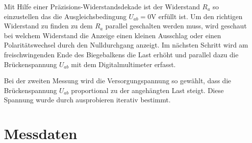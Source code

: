 Mit Hilfe einer Präzisions-Widerstandsdekade ist der Widerstand \( R_a \)
so einzustellen das die Ausgleichsbedingung \( U_{ab} = 0 \si{\volt} \) erfüllt ist.
Um den richtigen Widerstand zu finden zu dem \( R_a \) parallel geschalten werden muss,
wird geschaut bei welchem Widerstand die Anzeige einen kleinen Ausschlag
oder einen Polaritätswechsel durch den Nulldurchgang anzeigt.
Im nächsten Schritt wird am freischwingenden Ende des Biegebalkens die Last erhöht
und parallel dazu die Brückenspannung \( U_{ab} \) mit dem Digitalmultimeter erfasst.

Bei der zweiten Messung wird die Versorgungspannung so gewählt,
dass die Brückenspannung \( U_{ab} \) proportional zu der angehängten Last steigt.
Diese Spannung wurde durch ausprobieren iterativ bestimmt.

\section[Messdaten]{Messdaten}

